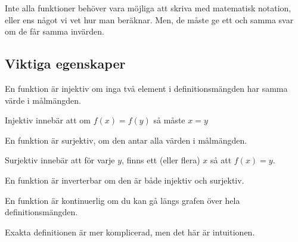 \begin{obs}
	Inte alla funktioner behöver vara möjliga att skriva med matematisk notation, eller ens något vi vet hur man beräknar. Men, de måste ge ett och samma svar om de får samma invärden.
\end{obs}


\subsection{Viktiga egenskaper}

\begin{definition}[Injektiv]
	En funktion är injektiv om inga två element i definitionsmängden har samma värde i målmängden.
\end{definition}

\begin{obs}
	Injektiv innebär att om \(f(x) = f(y)\) så måste \(x = y\)
\end{obs}


\begin{definition}[Surjektiv]
	En funktion är surjektiv, om den antar alla värden i målmängden.
\end{definition}

\begin{obs}
	Surjektiv innebär att för varje \(y\), finns ett (eller flera) \(x\) så att \(f(x) = y\).
\end{obs}

\begin{definition}[Inverterbar]
	En funktion är inverterbar om den är både injektiv och surjektiv.
\end{definition}

\begin{definition}
	En funktion är kontinuerlig om du kan gå längs grafen över hela definitionsmängden.	
\end{definition}

\begin{obs}
	Exakta definitionen är mer komplicerad, men det här är intuitionen.
\end{obs}

